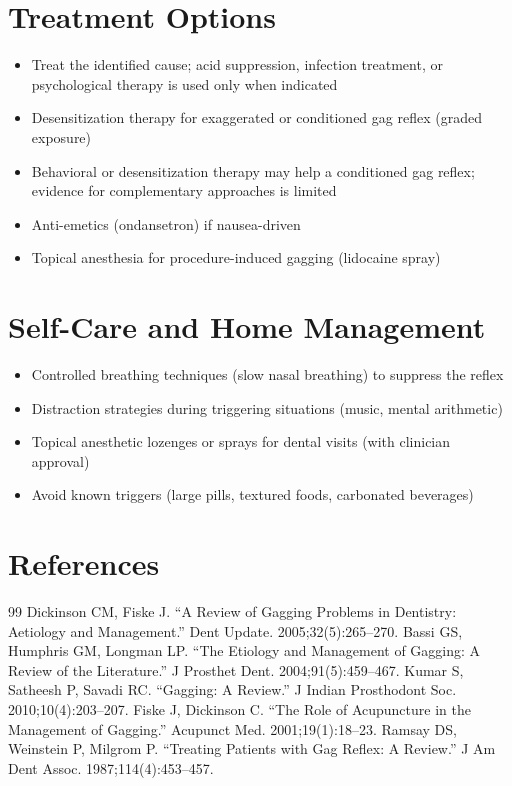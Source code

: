 \section*{Treatment Options}
\begin{itemize}
  \item Treat the identified cause; acid suppression, infection treatment, or psychological therapy is used only when indicated
  \item Desensitization therapy for exaggerated or conditioned gag reflex (graded exposure)
  \item Behavioral or desensitization therapy may help a conditioned gag reflex; evidence for complementary approaches is limited
  \item Anti-emetics (ondansetron) if nausea-driven
  \item Topical anesthesia for procedure-induced gagging (lidocaine spray)
\end{itemize}

\section*{Self-Care and Home Management}
\begin{itemize}
  \item Controlled breathing techniques (slow nasal breathing) to suppress the reflex
  \item Distraction strategies during triggering situations (music, mental arithmetic)
  \item Topical anesthetic lozenges or sprays for dental visits (with clinician approval)
  \item Avoid known triggers (large pills, textured foods, carbonated beverages)
\end{itemize}

\section*{References}
\begin{thebibliography}{99}
 Dickinson CM, Fiske J. ``A Review of Gagging Problems in Dentistry: Aetiology and Management.'' Dent Update. 2005;32(5):265--270.
 Bassi GS, Humphris GM, Longman LP. ``The Etiology and Management of Gagging: A Review of the Literature.'' J Prosthet Dent. 2004;91(5):459--467.
 Kumar S, Satheesh P, Savadi RC. ``Gagging: A Review.'' J Indian Prosthodont Soc. 2010;10(4):203--207.
 Fiske J, Dickinson C. ``The Role of Acupuncture in the Management of Gagging.'' Acupunct Med. 2001;19(1):18--23.
 Ramsay DS, Weinstein P, Milgrom P. ``Treating Patients with Gag Reflex: A Review.'' J Am Dent Assoc. 1987;114(4):453--457.
\end{thebibliography}
